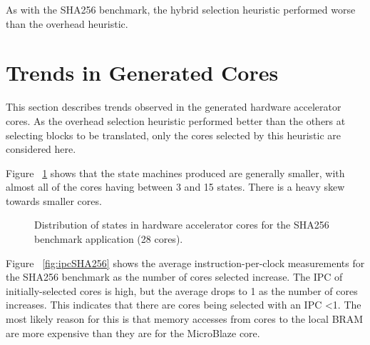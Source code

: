 \documentclass{UoYCSproject}
\begin{document}
As with the SHA256 benchmark, the hybrid selection heuristic performed worse than the overhead heuristic.

\section{Trends in Generated Cores}

This section describes trends observed in the generated hardware accelerator cores.
As the overhead selection heuristic performed better than the others at selecting blocks to be
translated, only the cores selected by this heuristic are considered here.

Figure ~\ref{fig:statesSHA256-28} shows that the state machines produced are generally smaller,
with almost all of the cores having between 3 and 15 states. There is a heavy skew towards smaller
cores.

\begin{figure}[H]
\caption{Distribution of states in hardware accelerator cores for the SHA256 benchmark application (28 cores).}
\label{fig:statesSHA256-28}
\end{figure}

Figure ~\ref{fig:ipcSHA256} shows the average instruction-per-clock measurements for the SHA256 benchmark as
the number of cores selected increase. The IPC of initially-selected cores
is high, but the average drops to 1 as the number of cores increases. This indicates that
there are cores being selected with an IPC <1. The most likely reason for this is that
memory accesses from cores to the local BRAM are more expensive than they are for the
MicroBlaze core.
\end{document}
